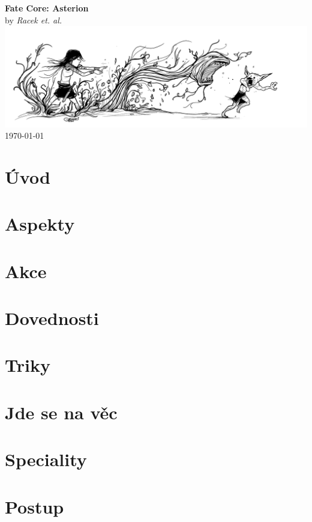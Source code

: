 \documentclass[12pt,a4paper,twoside,openany]{book}
\newcommand{\booktitle}{Fate Core: Asterion}
\newcommand{\authorname}{Racek et. al. }
\begin{document}
\begin{titlepage}
    \centering
    {\Huge\textbf{\booktitle}}\\[1.5cm]
    {\Large by \textit{\authorname}}\\[2cm]
    \includegraphics[width=\textwidth]{logo}\\[2cm]
    \vfill
    {\large \today}
\end{titlepage}

\frontmatter  %

\tableofcontents

\mainmatter   %
\setlength{\columnsep}{1cm}  %

\chapter{Úvod}
\label{chap:introduction}


\chapter{Aspekty}
\label{chap:aspekty}


\chapter{Akce}
\label{chap:akce}


\chapter{Dovednosti}
\label{chap:dovednosti}


\chapter{Triky}
\label{chap:triky}


\chapter{Jde se na věc}
\label{chap:jdesenavec}


\chapter{Speciality}
\label{chap:speciality}


\chapter{Postup}
\label{chap:postup}

\end{document}

